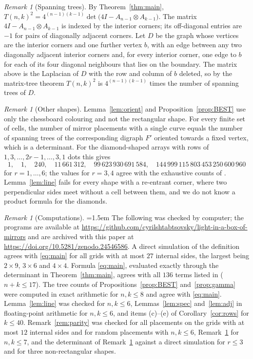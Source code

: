 \documentclass[11pt,a4paper]{amsart}
\theoremstyle{remark}
\newtheorem{remark}[theorem]{Remark}
\begin{document}
\begin{remark}[Spanning trees]\label{rem:trees}
By Theorem~\ref{thm:main}, $T(n,k)^2=4^{(n-1)(k-1)}\det\bigl(4I-A_{n-1}\otimes A_{k-1}\bigr)$. The matrix
$4I-A_{n-1}\otimes A_{k-1}$ is indexed by the interior corners; its off-diagonal entries are $-1$ for pairs of
diagonally adjacent corners. Let $D$ be the graph whose vertices are the interior corners and one further vertex
$b$, with an edge between any two diagonally adjacent interior corners and, for every interior corner, one edge to
$b$ for each of its four diagonal neighbours that lies on the boundary. The matrix above is the Laplacian of $D$
with the row and column of $b$ deleted, so by the matrix-tree theorem $T(n,k)^2$ is $4^{(n-1)(k-1)}$ times the
number of spanning trees of $D$.
\end{remark}

\begin{remark}[Other shapes]\label{rem:shapes}
Lemma~\ref{lem:orient} and Proposition~\ref{prop:BEST} use only the chessboard colouring and not the rectangular
shape. For every finite set of cells, the number of mirror placements with a single curve equals the number of
spanning trees of the corresponding digraph $F'$ oriented towards a fixed vertex, which is a determinant. For the
diamond-shaped arrays with rows of $1,3,\dots,2r-1,\dots,3,1$ dots this gives
\[ 1,\quad 1,\quad 240,\quad 11\,661\,312,\quad 99\,623\,930\,691\,584,\quad
144\,999\,115\,803\,453\,250\,600\,960 \]
for $r=1,\dots,6$;
the values for $r=3,4$ agree with the exhaustive counts of \cite{YN}. Lemma~\ref{lem:line} fails for every shape with a
re-entrant corner, where two perpendicular sides meet without a cell between them, and we do not know a product
formula for the diamonds.
\end{remark}

\begin{remark}[Computations]\label{rem:comp}
\emergencystretch=1.5em
The following was checked by computer; the programs are available at
\url{https://github.com/cyrilshtabtsovsky/light-in-a-box-of-mirrors} and are archived with this paper at \url{https://doi.org/10.5281/zenodo.24546586}.
A direct simulation of the definition agrees with \eqref{eq:main} for all grids with at most $27$ internal sides,
the largest being $2\times9$, $3\times6$ and $4\times4$. Formula \eqref{eq:main}, evaluated exactly through the
determinant in Theorem~\ref{thm:main}, agrees with all $136$ terms listed in \cite{OEIS} ($n+k\le17$).
The tree counts of Propositions~\ref{prop:BEST} and~\ref{prop:gamma} were computed in exact arithmetic for
$n,k\le 8$ and agree with \eqref{eq:main}. Lemma~\ref{lem:line} was checked for $n,k\le6$, Lemmas~\ref{lem:spec}
and~\ref{lem:adj} in floating-point arithmetic for $n,k\le6$, and items (c)--(e) of Corollary~\ref{cor:rows} for
$k\le40$. Remark~\ref{rem:parity} was checked for all placements on the grids with at most $12$ internal sides and for random
placements with $n,k\le6$, Remark~\ref{rem:trees} for $n,k\le7$, and
the determinant of Remark~\ref{rem:shapes} against a direct simulation for $r\le3$ and for three non-rectangular
shapes.
\end{remark}
\end{document}
